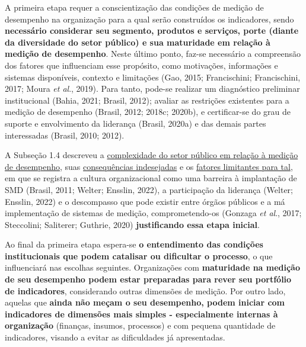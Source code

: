 \documentclass[
  letterpaper,
  DIV=11,
  numbers=noendperiod]{scrreprt}
\begin{document}
A primeira etapa requer a conscientização das condições de medição de
desempenho na organização para a qual serão construídos os indicadores,
sendo \textbf{necessário considerar seu segmento, produtos e serviços,
porte (diante da diversidade do setor público) e sua maturidade em
relação à medição de desempenho}. Neste último ponto, faz-se necessário
a compreensão dos fatores que influenciam esse propósito, como
motivações, informações e sistemas disponíveis, contexto e limitações
(Gao, 2015; Francischini; Francischini, 2017; Moura \emph{et al}.,
2019). Para tanto, pode-se realizar um diagnóstico preliminar
institucional (Bahia, 2021; Brasil, 2012); avaliar as restrições
existentes para a medição de desempenho (Brasil, 2012; 2018c; 2020b), e
certificar-se do grau de suporte e envolvimento da liderança (Brasil,
2020a) e das demais partes interessadas (Brasil, 2010; 2012).

A Subseção 1.4 descreveu a
\href{/o/AZWDclIWFqqJuBEvyQWk/s/ws6bIBOPv2tLRHdwbB7y/~/changes/788/1.-apresentacao/1.4-consequencias-indesejadas-e-limitacoes-da-medicao-de-desempenho\#a-complexidade-da-gestao-organizacional-e-do-setor-publico}{complexidade
do setor público em relação à medição de desempenho}, suas
\href{/o/AZWDclIWFqqJuBEvyQWk/s/ws6bIBOPv2tLRHdwbB7y/~/changes/788/1.-apresentacao/1.4-consequencias-indesejadas-e-limitacoes-da-medicao-de-desempenho\#consequencias-indesejadas-dos-smd-no-setor-publico}{consequências
indesejadas} e os
\href{/o/AZWDclIWFqqJuBEvyQWk/s/ws6bIBOPv2tLRHdwbB7y/~/changes/788/1.-apresentacao/1.4-consequencias-indesejadas-e-limitacoes-da-medicao-de-desempenho\#fatores-limitantes-a-medicao-de-desempenho-no-setor-publico}{fatores
limitantes para tal}, em que se registra a cultura organizacional como
uma barreira à implantação de SMD (Brasil, 2011; Welter; Ensslin, 2022),
a participação da liderança (Welter; Ensslin, 2022) e o descompasso que
pode existir entre órgãos públicos e a má implementação de sistemas de
medição, comprometendo-os (Gonzaga \emph{et al}., 2017; Steccolini;
Saliterer; Guthrie, 2020) \textbf{justificando essa etapa inicial}.

Ao final da primeira etapa espera-se \textbf{o entendimento das
condições institucionais que podem catalisar ou dificultar o processo},
o que influenciará nas escolhas seguintes. Organizações com
\textbf{maturidade na medição de seu desempenho podem estar preparadas
para rever seu portfólio de indicadores}, considerando outras dimensões
de medição. Por outro lado, aquelas que \textbf{ainda não meçam o seu
desempenho, podem iniciar com indicadores de dimensões mais simples -
especialmente internas à organização} (finanças, insumos, processos) e
com pequena quantidade de indicadores, visando a evitar as dificuldades
já apresentadas.
\end{document}
